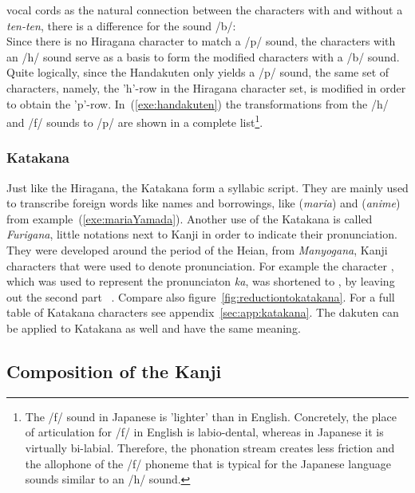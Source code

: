 vocal cords as the natural connection between the characters with and without 
a \emph{ten-ten}, there is a difference for the sound /b/:\\
Since there is no Hiragana character to match a /p/ sound, the characters with
an /h/ sound serve as a basis to form the modified characters with a /b/ sound.
Quite logically, since the Handakuten only yields a /p/ sound, the same set of
characters, namely, the 'h'-row in the Hiragana character set, is modified in 
order to obtain the 'p'-row. In~(\ref{exe:handakuten}) the transformations from 
the /h/ and /f/ sounds to /p/ are shown in a complete list\footnote{
The /f/ sound in Japanese is 'lighter' than in English. Concretely, the place of
articulation for /f/ in English is labio-dental, whereas in Japanese it is 
virtually bi-labial. Therefore, the phonation stream creates less friction and
the allophone of the /f/ phoneme that is typical for the Japanese language sounds
similar to an /h/ sound.}.

\subsubsection{Katakana }
\label{sec:katakana}

Just like the Hiragana, the Katakana form a syllabic script. They are mainly used
to transcribe foreign words like names and borrowings, like 
(\emph{maria}) and  (\emph{anime}) from 
example~(\ref{exe:mariaYamada}). Another use of the Katakana is called 
\emph{Furigana}, little notations next to Kanji in order to indicate their 
pronunciation. They were developed around the period of the Heian, from 
\emph{Manyogana}, Kanji characters that were used to denote pronunciation.
For example the character , which was used to represent the pronunciaton
\emph{ka}, was shortened to , by leaving out the second part 
~. Compare also figure~\ref{fig:reductiontokatakana}. For a full table of Katakana characters see 
appendix~\ref{sec:app:katakana}. The dakuten can be applied to Katakana as well 
and have the same meaning.

\subsection{Composition of the Kanji }
\label{sec:compositionofkanji}

